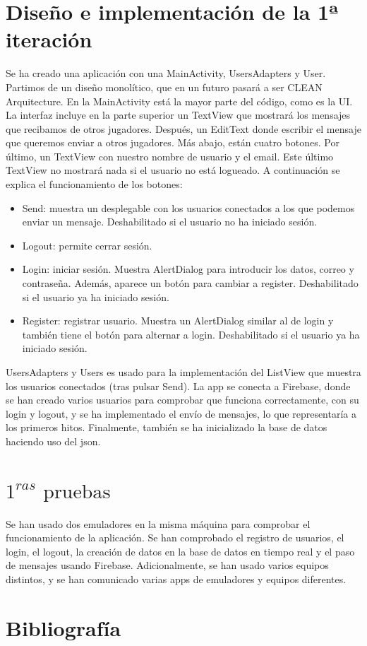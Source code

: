 \documentclass[a4paper,openright,12pt]{article}
\begin{document}
\section{Diseño e implementación de la 1ª iteración}
Se ha creado una aplicación con una MainActivity, UsersAdapters y User. Partimos de un diseño monolítico, que en un futuro pasará a ser CLEAN Arquitecture. En la MainActivity está la mayor parte del código, como es la UI. La interfaz incluye en la parte superior un TextView que mostrará los mensajes que recibamos de otros jugadores. Después, un EditText donde escribir el mensaje que queremos enviar a otros jugadores. Más abajo, están cuatro botones. Por último, un TextView con nuestro nombre de usuario y el email. Este último TextView no mostrará nada si el usuario no está logueado.
A continuación se explica el funcionamiento de los botones:
\begin{itemize}
    \item Send: muestra un desplegable con los usuarios conectados a los que podemos enviar un mensaje. Deshabilitado si el usuario no ha iniciado sesión.
    \item Logout: permite cerrar sesión.
    \item Login: iniciar sesión. Muestra AlertDialog para introducir los datos, correo y contraseña. Además, aparece un botón para cambiar a register. Deshabilitado si el usuario ya ha iniciado sesión.
    \item Register: registrar usuario. Muestra un AlertDialog similar al de login y también tiene el botón para alternar a login. Deshabilitado si el usuario ya ha iniciado sesión.
\end{itemize}

UsersAdapters y Users es usado para la implementación del ListView que muestra los usuarios conectados (tras pulsar Send). La app se conecta a Firebase, donde se han creado varios usuarios para comprobar que funciona correctamente, con su login y logout, y se ha implementado el envío de mensajes, lo que representaría a los primeros hitos.
Finalmente, también se ha inicializado la base de datos haciendo uso del json.

\section{$1^{ras} \text{ pruebas}$}
Se han usado dos emuladores en la misma máquina para comprobar el funcionamiento de la aplicación. Se han comprobado el registro de usuarios, el login, el logout, la creación de datos en la base de datos en tiempo real y el paso de mensajes usando Firebase. Adicionalmente, se han usado varios equipos distintos, y se han comunicado varias apps de emuladores y equipos diferentes.


\section{Bibliografía}


\end{document}
